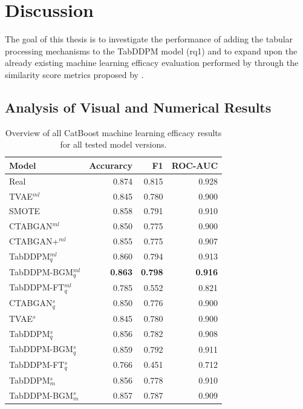 \newpage
\section{Discussion}
\label{ch:results-discussion}
The goal of this thesis is to investigate the performance of adding the tabular processing mechanisms to the TabDDPM model (\gls{rq}1) and 
to expand upon the already existing machine learning efficacy evaluation performed by \cite{kotelnikov2022TabDDPMModellingTabular} through the similarity score metrics proposed by \cite{chundawat2022UniversalMetricRobust}.

\subsection*{Analysis of Visual and Numerical Results}

\begin{table}[h]
	\centering
	\begin{tabular}{lrrr}
		\toprule
		\textbf{Model}       & \textbf{Accurarcy} & \textbf{F1}     & \textbf{ROC-AUC} \\
		\midrule
		Real                 & 0.874              & 0.815           & 0.928            \\
		TVAE$^{ml}$          & 0.845              & 0.780           & 0.900            \\
		SMOTE                & 0.858              & 0.791           & 0.910            \\
		CTABGAN$^{ml}$       & 0.850              & 0.775           & 0.900            \\
		CTABGAN+$^{ml}$      & 0.855              & 0.775           & 0.907            \\
		TabDDPM$^{ml}_q$     & 0.860              & 0.794           & 0.913            \\
		TabDDPM-BGM$^{ml}_q$ & \textbf{0.863}     & \textbf{0.798} & \textbf{0.916}   \\
		TabDDPM-FT$^{ml}_q$  & 0.785              & 0.552           & 0.821            \\
		CTABGAN$^{s}_q$      & 0.850              & 0.776           & 0.900            \\
		TVAE$^{s}$           & 0.845              & 0.780           & 0.900            \\
		TabDDPM$^{s}_q$      & 0.856              & 0.782           & 0.908            \\
		TabDDPM-BGM$^{s}_q$  & 0.859              & 0.792           & 0.911            \\
		TabDDPM-FT$^{s}_q$   & 0.766              & 0.451           & 0.712            \\
		TabDDPM$^{s}_m$      & 0.856              & 0.778           & 0.910            \\
		TabDDPM-BGM$^{s}_m$  & 0.857              & 0.787           & 0.909            \\
		\bottomrule
	\end{tabular}
	\caption{Overview of all CatBoost machine learning efficacy results for all tested model versions.}
	\label{tab:ml-all}
\end{table}


